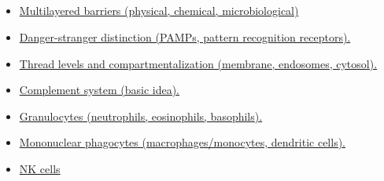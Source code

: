 \documentclass[10pt, a4paper]{article}
\begin{document}
\subsection{} \begin{itemize} \item \href{https://www.notion.so/fec1fb88405946999d2c75f6392a87e8}{Multilayered barriers (physical, chemical, microbiological)} \item \href{https://www.notion.so/6e738c936b1e4a4bab07b36d33be6b81}{Danger-stranger distinction (PAMPs, pattern recognition receptors).} \item \href{https://www.notion.so/205985889f7644a288b9e6e8cf7647bd}{Thread levels and compartmentalization (membrane, endosomes, cytosol).} \item \href{https://www.notion.so/945013fe8dd847d1ae7a8316383053f3}{Complement system (basic idea).} \item \href{https://www.notion.so/4359bfa3f3c845b885820a7318cdc6b2}{Granulocytes (neutrophils, eosinophils, basophils).} \item \href{https://www.notion.so/726fd412285e4b999fb2e53b693a55b9}{Mononuclear phagocytes (macrophages/monocytes, dendritic cells).} \item \href{https://www.notion.so/1e8a0d8c78f64621912c2f86df35c9e7}{NK cells} \end{itemize}
\end{document}
